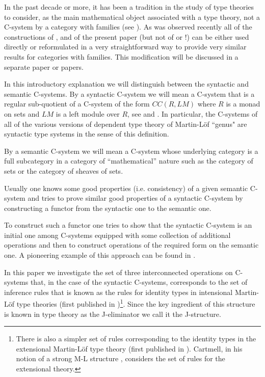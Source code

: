 \documentclass[12pt]{article}
\numberwithin{equation}{section}
\newcommand{\toCC}{CC} %
\begin{document}
In the past decade or more, it has been a tradition in the study of type
theories to consider, as the main mathematical object associated with a type
theory, not a C-system by a category with families (see \cite{Dybjer}). As was
observed recently all of the constructions of \cite{Cfromauniverse},
\cite{fromunivwithPi} and of the present paper (but not of \cite{Csubsystems}
or \cite{Cofamodule}!) can be either used directly or reformulated in a very
straightforward way to provide very similar results for categories with
families. This modification will be discussed in a separate paper or papers.

In this introductory explanation we will distinguish between the syntactic and
semantic C-systems. By a syntactic C-system we will mean a C-system that is a
regular sub-quotient of a C-system of the form $\toCC(R,LM)$ where $R$ is a monad
on sets and $LM$ is a left module over $R$, see \cite{Cofamodule} and
\cite{Csubsystems}. In particular, the C-systems of all of the various versions
of dependent type theory of Martin-L\"of ``genus" are syntactic type systems in
the sense of this definition.

By a semantic C-system we will mean a C-system whose underlying category is a
full subcategory in a category of ``mathematical'' nature such as the category
of sets or the category of sheaves of sets.

Usually one knows some good properties (i.e. consistency) of a given semantic
C-system and tries to prove similar good properties of a syntactic C-system by
constructing a functor from the syntactic one to the semantic one.

To construct such a functor one tries to show that the syntactic C-system is an
initial one among C-systems equipped with some collection of additional
operations and then to construct operations of the required form on the
semantic one. A pioneering example of this approach can be found in
\cite{Streicher}.

In this paper we investigate the set of three interconnected operations on
C-systems that, in the case of the syntactic C-systems, corresponds to the set
of inference rules that is known as the rules for identity types in intensional
Martin-L\"of type theories (first published in \cite{MLTT73})\footnote{There is
  also a simpler set of rules corresponding to the identity types in the
  extensional Martin-L\"of type theory (first published in
  \cite{MLTT79}). Cartmell, in his notion of a strong M-L structure
  \cite[p.3.36]{Cartmell0}, considers the set of rules for the extensional
  theory.}. Since the key ingredient of this structure is known in type theory
as the J-eliminator we call it the J-structure.
\end{document}
